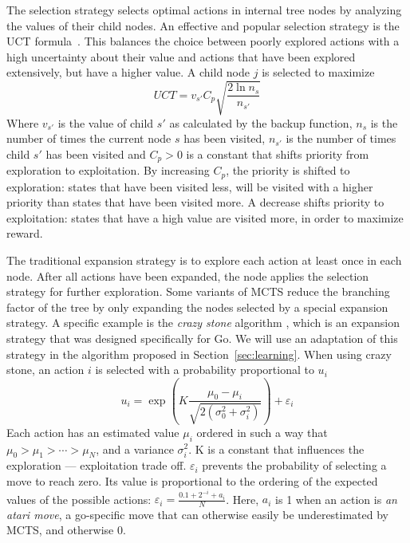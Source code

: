 The selection strategy selects optimal actions in internal tree nodes by
analyzing the values of their child nodes. An effective and popular selection
strategy is the UCT formula~\cite{kocsis2006bandit}. This balances the choice
between poorly explored actions with a high uncertainty about their value and
actions that have been explored extensively, but have a higher value. A child
node $j$ is selected to maximize
\begin{equation}
	\label{eq:uct}
	UCT = v_{s'} C_p \sqrt{\frac{2 \ln n_s}{n_{s'}}}
\end{equation}
Where $v_{s'}$ is the value of child $s'$ as calculated by the backup function,
$n_s$ is the number of times the current node $s$ has been visited, $n_{s'}$ is
the number of times child $s'$ has been visited and $C_p > 0$ is a constant
that shifts priority from exploration to exploitation. By increasing $C_p$, the
priority is shifted to exploration: states that have been visited less, will be
visited with a higher priority than states that have been visited more. A
decrease shifts priority to exploitation: states that have a high value are
visited more, in order to maximize reward. 

The traditional expansion strategy is to explore each action at least once in
each node. After all actions have been expanded, the node applies the selection
strategy for further exploration. Some variants of MCTS reduce the branching
factor of the tree by only expanding the nodes selected by a special expansion
strategy. A specific example is the \emph{crazy stone} algorithm
\cite{coulom2007efficient}, which is an expansion strategy that was designed
specifically for Go. We will use an adaptation of this strategy in the algorithm
proposed in Section~\ref{sec:learning}.  When using crazy stone, an action $i$
is selected with a probability proportional to $u_i$
\begin{equation}
	\label{eq:crazystone}
	u_i = \exp\left(K \frac{\mu_0 - \mu_i}{\sqrt{2\left(\sigma_0^2 +
\sigma_i^2\right)}}\right) + \varepsilon_i
\end{equation}
Each action has an estimated value $\mu_i$ ordered in such a way that $\mu_0 >
\mu_1 > \cdots > \mu_N$, and a variance $\sigma_i^2$. K is a constant
that influences the exploration --- exploitation trade off. $\varepsilon_i$ prevents
the probability of selecting a move to reach zero. Its value is proportional
to the ordering of the expected values of the possible actions: $\varepsilon_i =
\frac{0.1 + 2^{-i} + a_i}{N}$\@.
Here, $a_i$ is 1 when an action is \emph{an atari move}, a go-specific
move that can otherwise easily be underestimated by MCTS, and otherwise 0.

